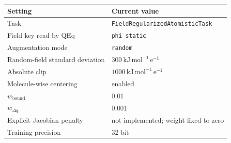 \documentclass[11pt,a4paper]{article}
\begin{document}
\begin{center}
\begin{tabular}{@{}ll@{}}
\toprule
Setting & Current value\\
\midrule
Task & \texttt{FieldRegularizedAtomisticTask}\\
Field key read by QEq & \texttt{phi\_static}\\
Augmentation mode & \texttt{random}\\
Random-field standard deviation & $300\ \mathrm{kJ\,mol^{-1}\,e^{-1}}$\\
Absolute clip & $1000\ \mathrm{kJ\,mol^{-1}\,e^{-1}}$\\
Molecule-wise centering & enabled\\
$w_{\mathrm{bound}}$ & $0.01$\\
$w_{\Delta q}$ & $0.001$\\
Explicit Jacobian penalty & not implemented; weight fixed to zero\\
Training precision & 32 bit\\
\bottomrule
\end{tabular}
\end{center}
\end{document}
